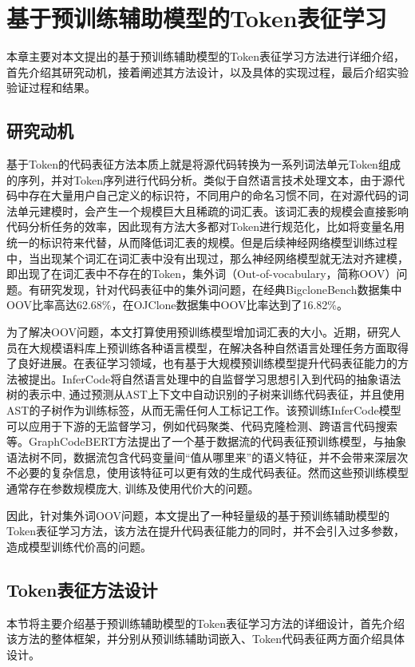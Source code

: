 \chapter{基于预训练辅助模型的Token表征学习}
\label{chap:Token}
本章主要对本文提出的基于预训练辅助模型的Token表征学习方法进行详细介绍，首先介绍其研究动机，接着阐述其方法设计，以及具体的实现过程，最后介绍实验验证过程和结果。

\section{研究动机}
\label{sec:Motivation}

基于Token的代码表征方法本质上就是将源代码转换为一系列词法单元Token组成的序列，并对Token序列进行代码分析。类似于自然语言技术处理文本，由于源代码中存在大量用户自己定义的标识符，不同用户的命名习惯不同，在对源代码的词法单元建模时，会产生一个规模巨大且稀疏的词汇表。该词汇表的规模会直接影响代码分析任务的效率，因此现有方法大多都对Token进行规范化，比如将变量名用统一的标识符来代替，从而降低词汇表的规模。但是后续神经网络模型训练过程中，当出现某个词汇在词汇表中没有出现过，那么神经网络模型就无法对齐建模，即出现了在词汇表中不存在的Token，集外词（Out-of-vocabulary，简称OOV）问题。有研究\cite{RJXB202205011}发现，针对代码表征中的集外词问题，在经典BigcloneBench\cite{7332459}数据集中OOV比率高达62.68\%，在OJClone数据集\cite{WOS:000485474201046}中OOV比率达到了16.82\%。

为了解决OOV问题，本文打算使用预训练模型增加词汇表的大小。近期，研究人员在大规模语料库上预训练各种语言模型，在解决各种自然语言处理任务方面取得了良好进展\cite{zhao2023survey}。在表征学习领域，也有基于大规模预训练模型提升代码表征能力的方法被提出。InferCode\cite{9402028}将自然语言处理中的自监督学习思想引入到代码的抽象语法树的表示中, 通过预测从AST上下文中自动识别的子树来训练代码表征，并且使用AST的子树作为训练标签，从而无需任何人工标记工作。该预训练InferCode模型可以应用于下游的无监督学习，例如代码聚类、代码克隆检测、跨语言代码搜索等。GraphCodeBERT\cite{guo2021graphcodebert}方法提出了一个基于数据流的代码表征预训练模型，与抽象语法树不同，数据流包含代码变量间“值从哪里来”的语义特征，并不会带来深层次不必要的复杂信息，使用该特征可以更有效的生成代码表征。然而这些预训练模型通常存在参数规模庞大, 训练及使用代价大的问题。

因此，针对集外词OOV问题，本文提出了一种轻量级的基于预训练辅助模型的Token表征学习方法，该方法在提升代码表征能力的同时，并不会引入过多参数，造成模型训练代价高的问题。

\section{Token表征方法设计}
\label{sec:Token}
本节将主要介绍基于预训练辅助模型的Token表征学习方法的详细设计，首先介绍该方法的整体框架，并分别从预训练辅助词嵌入、Token代码表征两方面介绍具体设计。


